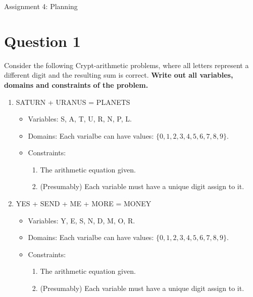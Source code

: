 \documentclass[11pt]{article}
\begin{document}
\begin{flushleft}
Assignment 4: Planning

\section*{Question 1}

Consider the following Crypt-arithmetic problems, where all letters represent a
different digit and the resulting sum is correct. \textbf{Write out all
variables, domains and constraints of the problem.}

    \begin{enumerate}[label=(\alph*)]
        \item SATURN + URANUS = PLANETS
            \begin{itemize}
                \item Variables: S, A, T, U, R, N, P, L.
                \item Domains: Each varialbe can have values: $\{0, 1, 2, 3, 4,
                    5, 6, 7, 8, 9\}$.
                \item Constraints:
                    \begin{enumerate}[label=\arabic*.]
                        \item The arithmetic equation given.
                        \item (Presumably) Each variable must have a unique
                            digit assign to it.
                    \end{enumerate}
            \end{itemize}
        \item YES + SEND + ME + MORE = MONEY
            \begin{itemize}
                \item Variables: Y, E, S, N, D, M, O, R.
                \item Domains: Each varialbe can have values: $\{0, 1, 2, 3, 4,
                    5, 6, 7, 8, 9\}$.
                \item Constraints:
                    \begin{enumerate}[label=\arabic*.]
                        \item The arithmetic equation given.
                        \item (Presumably) Each variable must have a unique
                            digit assign to it.
                    \end{enumerate}
            \end{itemize}
    \end{enumerate}


\end{flushleft}
\end{document}
